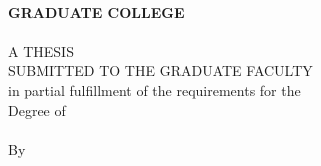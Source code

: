 \begin{center}
    \textbf{\university}\\[1em]
    \textbf{GRADUATE COLLEGE}\\[5em]

    \textbf{\thesistitle}\\[8em]

    A THESIS\\
    SUBMITTED TO THE GRADUATE FACULTY\\[1em]

    in partial fulfillment of the requirements for the\\[1em]

    Degree of\\[1em]

    \degree\\[8em]

    By \authorname\\
    \location\\
    \submissionyear
\end{center}
\newpage

